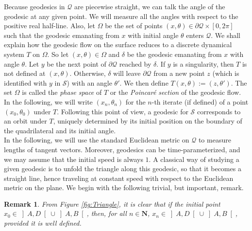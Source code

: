 \documentclass[11pt]{article}
\newtheorem*{rmk}{Remark}
\begin{document}
Because geodesics in $\mathcal{Q}$ are piecewise straight, we can talk the angle of the geodesic at any given point. We will measure all the angles with respect to the positive real half-line. Also, let $\Omega$ be the set of points $(x,\theta)\in\partial\mathcal{Q}\times\left[0,2\pi\right]$ such that the geodesic emanating from $x$ with initial angle $\theta$ enters $\mathcal{Q}$. We shall explain how the geodesic flow on the surface reduces to a discrete dynamical system $T$ on $\Omega$. So let $(x,\theta)\in\Omega$ and $\delta$ be the geodesic emanating from $x$ with angle $\theta$. Let $y$ be the next point of $\partial\mathcal{Q}$ reached by $\delta$. If $y$ is a singularity, then $T$ is not defined at $(x,\theta)$. Otherwise, $\delta$ will leave $\partial\mathcal{Q}$ from a new point $z$ (which is identified with $y$ in $\mathcal{S}$) with an angle $\theta'$. We then define $T(x,\theta):=(z,\theta')$. The set $\Omega$ is called the \textit{phase space} of $T$ or the \textit{Poincaré section} of the geodesic flow. In the following, we will write $\left(x_{n},\theta_{n}\right)$ for the $n$-th iterate (if defined) of a point $\left(x_{0},\theta_{0}\right)$ under $T$. Following this point of view, a geodesic for $\mathcal{S}$ corresponds to an orbit under $T$, uniquely determined by its initial position on the boundary of the quadrilateral and its initial angle.\\
In the following, we will use the standard Euclidean metric on $\mathcal{Q}$ to measure lengths of tangent vectors.
Moreover, geodesics can be time-parameterized, and we may assume that the initial speed is always $1$. A classical way of studying a given geodesic is to unfold the triangle along this geodesic, so that it becomes a straight line, hence traveling at constant speed with respect to the Euclidean metric on the plane. We begin with the following trivial, but important, remark.

\begin{rmk}
    From Figure \ref{fig:Triangle}, it is clear that if the initial point $x_{0}\in\left]A,D\right[\cup\left]A,B\right[$, then, for all $n\in\mathbf{N}$, $x_{n}\in\left]A,D\right[\cup\left]A,B\right[$, provided it is well defined.
\end{rmk}
\end{document}
